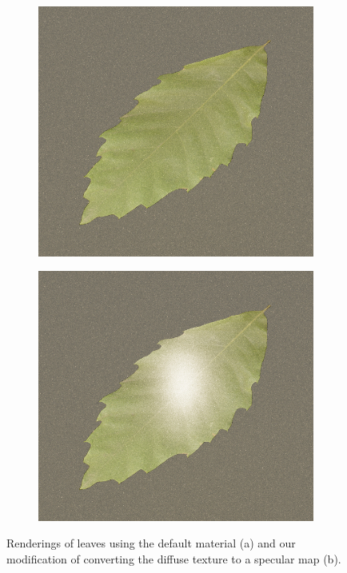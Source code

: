 \begin{figure}[t]
    \centering
    \begin{subfigure}[b]{0.3\linewidth}
        \centering
        \includegraphics[width=1\linewidth]{img/leaf_no_spec.jpg}
        \caption{}
    \end{subfigure}
    \begin{subfigure}[b]{0.3\linewidth}
        \centering
        \includegraphics[width=1\linewidth]{img/leaf_spec.jpg}
        \caption{}
    \end{subfigure}
	\caption[Comparison of renderings with and without specular maps]{Renderings of leaves using the default material (a) and our modification of converting the diffuse texture to a specular map (b).}
	\label{fig:leaf_renderings}
\end{figure}

